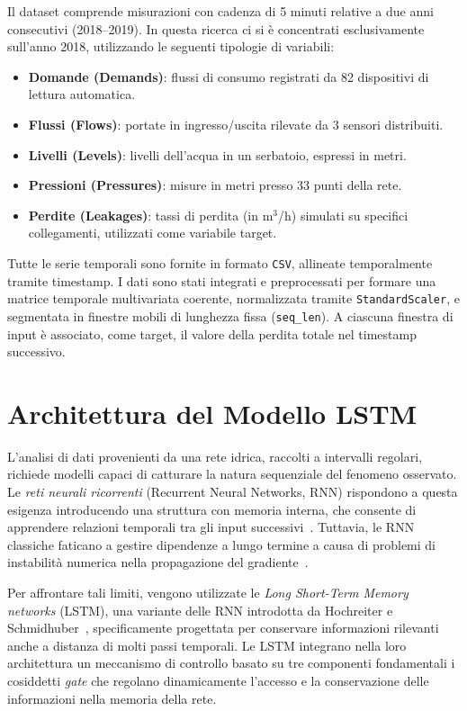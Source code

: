 \documentclass{article}
\begin{document}
Il dataset comprende misurazioni con cadenza di 5 minuti relative a due anni consecutivi (2018--2019). 
In questa ricerca ci si è concentrati esclusivamente sull'anno 2018, utilizzando le seguenti tipologie 
di variabili:
\begin{itemize}
    \item \textbf{Domande (Demands)}: flussi di consumo registrati da 82 dispositivi di lettura automatica.
    \item \textbf{Flussi (Flows)}: portate in ingresso/uscita rilevate da 3 sensori distribuiti.
    \item \textbf{Livelli (Levels)}: livelli dell’acqua in un serbatoio, espressi in metri.
    \item \textbf{Pressioni (Pressures)}: misure in metri presso 33 punti della rete.
    \item \textbf{Perdite (Leakages)}: tassi di perdita (in m$^3$/h) simulati su specifici collegamenti, utilizzati come variabile target.
\end{itemize}

Tutte le serie temporali sono fornite in formato \texttt{CSV}, allineate temporalmente
tramite timestamp. I dati sono stati integrati e preprocessati per formare una matrice 
temporale multivariata coerente, normalizzata tramite \texttt{StandardScaler}, e segmentata 
in finestre mobili di lunghezza fissa (\texttt{seq\_len}). A ciascuna finestra di input è 
associato, come target, il valore della perdita totale nel timestamp successivo.

\section{Architettura del Modello LSTM}

L'analisi di dati provenienti da una rete idrica, raccolti a intervalli regolari, richiede modelli 
capaci di catturare la natura sequenziale del fenomeno osservato. Le \emph{reti neurali ricorrenti} 
(Recurrent Neural Networks, RNN) rispondono a questa esigenza introducendo una struttura con memoria 
interna, che consente di apprendere relazioni temporali tra gli input successivi~\cite{elman1990finding}. 
Tuttavia, le RNN classiche faticano a gestire dipendenze a lungo termine a causa di problemi di instabilità 
numerica nella propagazione del gradiente~\cite{bengio1994learning}.

Per affrontare tali limiti, vengono utilizzate le \emph{Long Short-Term Memory networks} (LSTM), una 
variante delle RNN introdotta da Hochreiter e Schmidhuber~\cite{hochreiter1997long}, specificamente 
progettata per conservare informazioni rilevanti anche a distanza di molti passi temporali. Le LSTM 
integrano nella loro architettura un meccanismo di controllo basato su tre componenti fondamentali 
i cosiddetti \textit{gate} che regolano dinamicamente l'accesso e la conservazione delle informazioni 
nella memoria della rete.
\end{document}
